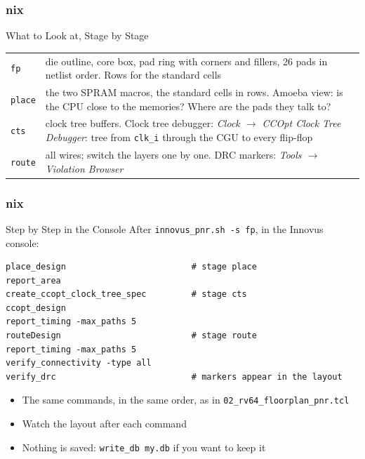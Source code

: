 \documentclass{beamer}
\newcommand{\astitle}{nix}
\newcommand{\assubtitle}{nix}
\newcommand{\cmd}[1]{\texttt{#1}}
\begin{document}
\renewcommand{\assubtitle}{What to Look at, Stage by Stage}
\begin{frame}
\frametitle{\astitle}
\begin{block}{\assubtitle}
  \footnotesize
  \begin{tabularx}{\linewidth}{@{}lY@{}}
    \cmd{fp}    & die outline, core box, pad ring with corners and fillers,
                  26 pads in netlist order. Rows for the standard cells\\[3pt]
    \cmd{place} & the two SPRAM macros, the standard cells in rows.
                  Amoeba view: is the CPU close to the memories?
                  Where are the pads they talk to?\\[3pt]
    \cmd{cts}   & clock tree buffers. Clock tree debugger:
                  \emph{Clock $\rightarrow$ CCOpt Clock Tree Debugger}: tree from
                  \cmd{clk\_i} through the CGU to every flip-flop\\[3pt]
    \cmd{route} & all wires; switch the layers one by one.
                  DRC markers: \emph{Tools $\rightarrow$ Violation Browser}\\
  \end{tabularx}
\end{block}
\end{frame}

\renewcommand{\assubtitle}{Step by Step in the Console}
\begin{frame}[fragile]
\frametitle{\astitle}
\begin{block}{\assubtitle}
  After \cmd{innovus\_pnr.sh -s fp}, in the Innovus console:
\begin{lstlisting}[style=sh]
place_design                         # stage place
report_area
create_ccopt_clock_tree_spec         # stage cts
ccopt_design
report_timing -max_paths 5
routeDesign                          # stage route
report_timing -max_paths 5
verify_connectivity -type all
verify_drc                           # markers appear in the layout
\end{lstlisting}
  \begin{itemize}
    \item The same commands, in the same order, as in
      \cmd{02\_rv64\_floorplan\_pnr.tcl}
    \item Watch the layout after each command
    \item Nothing is saved: \cmd{write\_db my.db} if you want to keep it
  \end{itemize}
\end{block}
\end{frame}
\end{document}
